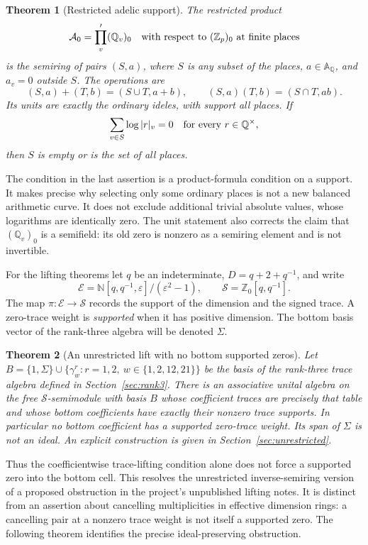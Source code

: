 \documentclass[11pt]{article}
\newcommand{\Z}{\mathbb Z}\newcommand{\N}{\mathbb N}\newcommand{\Q}{\mathbb Q}
\newcommand{\A}{\mathbb A}\newcommand{\B}{\mathbb B}\newcommand{\F}{\mathbb F}\newcommand{\C}{\mathbb C}
\newcommand{\eps}{\varepsilon}\newcommand{\supp}{\operatorname{supp}}
\newtheorem{theorem}{Theorem}[section]\newtheorem{proposition}[theorem]{Proposition}
\theoremstyle{definition}\newtheorem{definition}[theorem]{Definition}
\begin{document}
\begin{theorem}[Restricted adelic support]\label{thm:adeles-main}
The restricted product
\[
 \mathcal A_0=\prod_v'(\Q_v)_0
 \quad\hbox{with respect to }(\Z_p)_0\hbox{ at finite places}
\]
is the semiring of pairs $(S,a)$, where $S$ is any subset of the places, $a\in\A_\Q$, and $a_v=0$ outside $S$. The operations are
\[
 (S,a)+(T,b)=(S\cup T,a+b),\qquad
 (S,a)(T,b)=(S\cap T,ab).
\]
Its units are exactly the ordinary ideles, with support all places. If
\[
 \sum_{v\in S}\log|r|_v=0\quad\hbox{for every }r\in\Q^\times,
\]
then $S$ is empty or is the set of all places.
\end{theorem}

The condition in the last assertion is a product-formula condition on a support. It makes precise why selecting only some ordinary places is not a new balanced arithmetic curve. It does not exclude additional trivial absolute values, whose logarithms are identically zero. The unit statement also corrects the claim that $(\Q_v)_0$ is a semifield: its old zero is nonzero as a semiring element and is not invertible.

For the lifting theorems let $q$ be an indeterminate, $D=q+2+q^{-1}$, and write
\[
 \mathcal E=\N[q,q^{-1},\eps]/(\eps^2-1),\qquad
 \mathcal S=\Z_0[q,q^{-1}].
\]
The map $\pi:\mathcal E\to\mathcal S$ records the support of the dimension and the signed trace. A zero-trace weight is \emph{supported} when it has positive dimension. The bottom basis vector of the rank-three algebra will be denoted $\Sigma$.

\begin{theorem}[An unrestricted lift with no bottom supported zeros]\label{thm:no-bottom-main}
Let $B=\{1,\Sigma\}\cup\{\gamma_w^r:r=1,2,\ w\in\{1,2,12,21\}\}$ be the basis of the rank-three trace algebra defined in Section~\ref{sec:rank3}. There is an associative unital algebra on the free $\mathcal S$-semimodule with basis $B$ whose coefficient traces are precisely that table and whose bottom coefficients have exactly their nonzero trace supports. In particular no bottom coefficient has a supported zero-trace weight. Its span of $\Sigma$ is not an ideal. An explicit construction is given in Section~\ref{sec:unrestricted}.
\end{theorem}

Thus the coefficientwise trace-lifting condition alone does not force a supported zero into the bottom cell. This resolves the unrestricted inverse-semiring version of a proposed obstruction in the project's unpublished lifting notes. It is distinct from an assertion about cancelling multiplicities in effective dimension rings: a cancelling pair at a nonzero trace weight is not itself a supported zero. The following theorem identifies the precise ideal-preserving obstruction.
\end{document}
